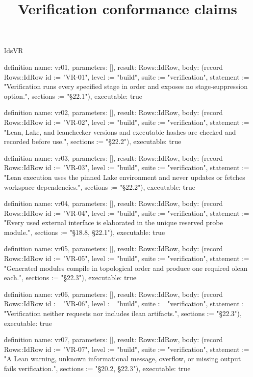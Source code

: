 \begin{lexlean}{IdsVR}
\title{Verification conformance claims}
\begin{semanticmodule}
definition{
  name: vr01,
  parameters: [],
  result: Rows::IdRow,
  body: (record Rows::IdRow {id := "VR-01", level := "build", suite := "verification", statement := "Verification runs every specified stage in order and exposes no stage-suppression option.", sections := "§22.1"}),
  executable: true
}

definition{
  name: vr02,
  parameters: [],
  result: Rows::IdRow,
  body: (record Rows::IdRow {id := "VR-02", level := "build", suite := "verification", statement := "Lean, Lake, and leanchecker versions and executable hashes are checked and recorded before use.", sections := "§22.2"}),
  executable: true
}

definition{
  name: vr03,
  parameters: [],
  result: Rows::IdRow,
  body: (record Rows::IdRow {id := "VR-03", level := "build", suite := "verification", statement := "Lean execution uses the pinned Lake environment and never updates or fetches workspace dependencies.", sections := "§22.2"}),
  executable: true
}

definition{
  name: vr04,
  parameters: [],
  result: Rows::IdRow,
  body: (record Rows::IdRow {id := "VR-04", level := "build", suite := "verification", statement := "Every used external interface is elaborated in the unique reserved probe module.", sections := "§18.8, §22.1"}),
  executable: true
}

definition{
  name: vr05,
  parameters: [],
  result: Rows::IdRow,
  body: (record Rows::IdRow {id := "VR-05", level := "build", suite := "verification", statement := "Generated modules compile in topological order and produce one required olean each.", sections := "§22.3"}),
  executable: true
}

definition{
  name: vr06,
  parameters: [],
  result: Rows::IdRow,
  body: (record Rows::IdRow {id := "VR-06", level := "build", suite := "verification", statement := "Verification neither requests nor includes ilean artifacts.", sections := "§22.3"}),
  executable: true
}

definition{
  name: vr07,
  parameters: [],
  result: Rows::IdRow,
  body: (record Rows::IdRow {id := "VR-07", level := "build", suite := "verification", statement := "A Lean warning, unknown informational message, overflow, or missing output fails verification.", sections := "§20.2, §22.3"}),
  executable: true
}


\end{semanticmodule}
\end{lexlean}
